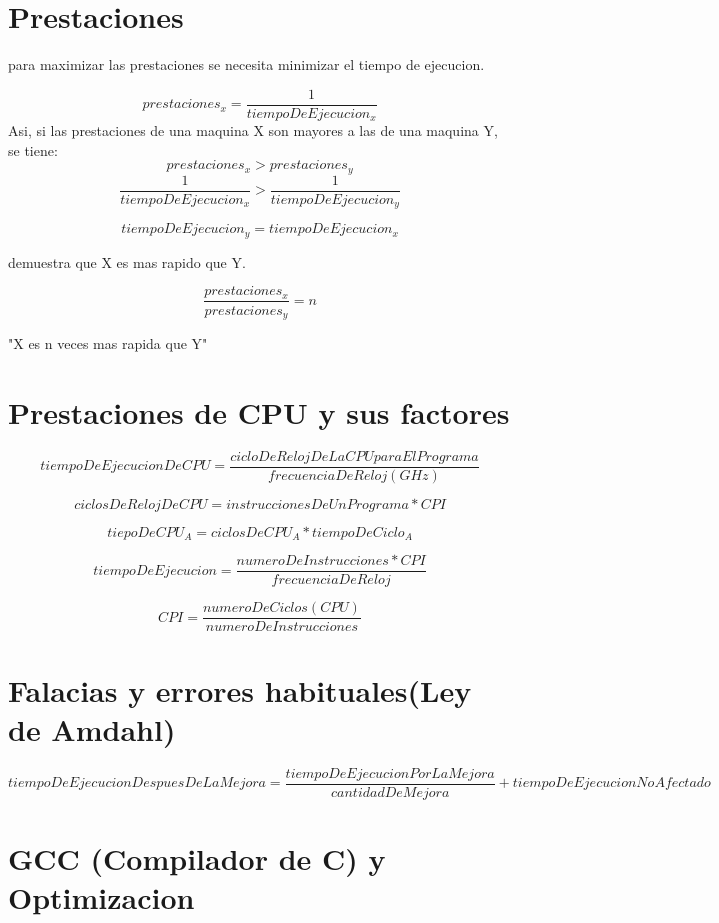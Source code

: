 \documentclass{article}
\title{}
\author{Brigido Noguera}
\date{June 2025}
\begin{document}
\maketitle
\section{Prestaciones}

para maximizar las prestaciones se necesita minimizar el tiempo
de ejecucion.

\[  
    prestaciones_x = \frac{1}{tiempoDeEjecucion_x}
\]
    Asi, si las prestaciones de una maquina X son mayores a las de una maquina Y, se tiene:
\[
    prestaciones_x > prestaciones_y
\]
\[\frac{1}{tiempoDeEjecucion_x} > \frac{1}{tiempoDeEjecucion_y}\]

\[tiempoDeEjecucion_y = tiempoDeEjecucion_x\]

demuestra que X es mas rapido que Y.

\[\frac{prestaciones_x}{prestaciones_y}=n\]

"X es n veces mas rapida que Y"


\section{Prestaciones de CPU y sus factores}

\[
    tiempoDeEjecucionDeCPU = \frac{cicloDeRelojDeLaCPUparaElPrograma}{frecuenciaDeReloj(GHz)}
\]

\[
    ciclosDeRelojDeCPU = instruccionesDeUnPrograma * CPI
\]

\[
    tiepoDeCPU_A = ciclosDeCPU_A * tiempoDeCiclo_A
\]

\[
    tiempoDeEjecucion = \frac{numeroDeInstrucciones *CPI}{frecuenciaDeReloj}
\]

\[
    CPI = \frac{numeroDeCiclos(CPU)}{numeroDeInstrucciones}
\]


\section{Falacias y errores habituales(Ley de Amdahl)}

\[
    tiempoDe EjecucionDespuesDeLaMejora = \frac{tiempoDeEjecucionPorLaMejora}{cantidadDeMejora} + tiempoDeEjecucionNoAfectado
\]

\section{GCC (Compilador de C) y Optimizacion}
\end{document}
